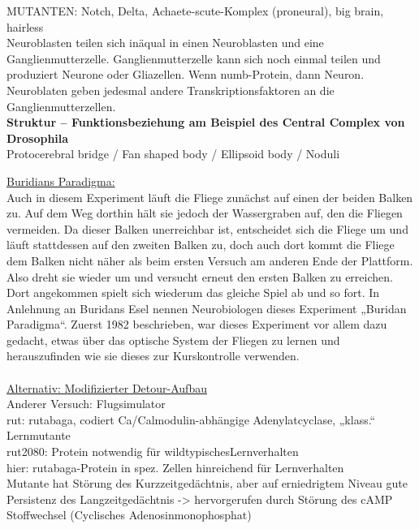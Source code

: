 MUTANTEN: Notch, Delta, Achaete-scute-Komplex (proneural), big brain, hairless\\

Neuroblasten teilen sich inäqual in einen Neuroblasten und eine Ganglienmutterzelle. Ganglienmutterzelle kann sich noch einmal teilen und produziert Neurone oder Gliazellen. Wenn numb-Protein, dann Neuron. Neuroblaten geben jedesmal andere Transkriptionsfaktoren an die Ganglienmutterzellen.\\

\textbf{Struktur – Funktionsbeziehung am Beispiel des Central Complex von Drosophila
}\\

Protocerebral bridge / Fan shaped body / Ellipsoid body / Noduli

\underline{Buridians Paradigma:}\\
Auch in diesem Experiment läuft die Fliege zunächst auf einen der beiden Balken zu. Auf dem Weg dorthin hält sie jedoch der Wassergraben auf, den die Fliegen vermeiden. Da dieser Balken unerreichbar ist, entscheidet sich die Fliege um und läuft stattdessen auf den zweiten Balken zu, doch auch dort kommt die Fliege dem Balken nicht näher als beim ersten Versuch am anderen Ende der Plattform. Also dreht sie wieder um und versucht erneut den ersten Balken zu erreichen. Dort angekommen spielt sich wiederum das gleiche Spiel ab und so fort. In Anlehnung an Buridans Esel nennen Neurobiologen dieses Experiment „Buridan Paradigma“. Zuerst 1982 beschrieben, war dieses Experiment vor allem dazu gedacht, etwas über das optische System der Fliegen zu lernen und herauszufinden wie sie dieses zur Kurskontrolle verwenden.
\\\\
\underline{Alternativ: Modifizierter Detour-Aufbau}\\
Anderer Versuch: Flugsimulator\\
rut: rutabaga, codiert Ca/Calmodulin-abhängige Adenylatcyclase, „klass.“ Lernmutante\\
rut2080: Protein notwendig für wildtypischesLernverhalten\\
hier: rutabaga-Protein in spez. Zellen hinreichend für Lernverhalten\\
Mutante hat Störung des Kurzzeitgedächtnis, aber auf erniedrigtem Niveau gute Persistenz des Langzeitgedächtnis -> hervorgerufen durch Störung des cAMP Stoffwechsel (Cyclisches Adenosinmonophosphat)
